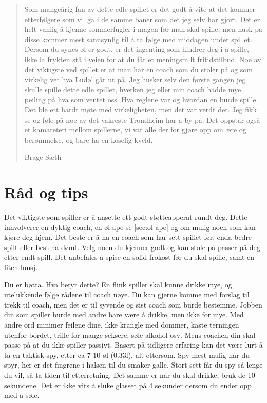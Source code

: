 \documentclass[10pt,a4paper,norsk,openany]{book}
\begin{document}
\blockquote[Brage Sæth]{%
  Som mangeårig fan av dette edle spillet er det godt å vite at det kommer
  etterfølgere som vil gå i de samme baner som det jeg selv har gjort. Det er
  helt vanlig å kjenne sommerfugler i magen før man skal spille, men husk på
  disse kommer mest sannsynlig til å ta følge med middagen under spillet. Dersom
  du synes øl er godt, er det ingenting som hindrer deg i å spille, ikke la
  frykten stå i veien for at du får et meningsfullt fritidstilbud. Noe av det
  viktigste ved spillet er at man har en coach som du stoler på og som virkelig
  vet hva Ludøl går ut på. Jeg husker selv den første gangen jeg skulle spille
  dette edle spillet, hverken jeg eller min coach hadde mye peiling på hva som
  ventet oss. Hva reglene var og hvordan en burde spille. Det ble ett hardt møte
  med virkeligheten, men det var verdt det. Jeg fikk se og føle på noe av det
  vakreste Trondheim har å by på. Det oppstår også et kamareteri mellom
  spillerne, vi var alle der for gjøre opp om ære og berømmelse, og bare ha en
  koselig kveld.}


\section{Råd og tips}

Det viktigste som spiller er å ansette ett godt støtteapperat rundt deg. Dette
innvolverer en dyktig coach, en øl-ape se \cref{sec:ol-ape} og om mulig noen som
kan kjøre deg hjem. Det beste er å ha en coach som har sett spillet før, enda
bedre spilt eller best ha dømt. Velg noen du kjenner godt og kan stole på passer
på deg etter endt spill. Det anbefales å spise en solid frokost før du skal
spille, samt en liten lunsj.

Du er bøtta. Hva betyr dette? En flink spiller skal kunne drikke mye, og
utelukkende følge rådene til coach nøye. Du kan gjerne komme med forslag til
trekk til coach, men det er til syvende og sist coach som burde bestemme. Jobben
din som spiller burde med andre bare være å drikke, men ikke for mye. Med andre
ord minimer feilene dine, ikke krangle med dommer, kaste terningen utenfor
bordet, trille for mange seksere, søle alkohol osv. Mens coachen din skal passe
på at du ikke spiller passivt. Basert på tidligere erfaring kan det være lurt å
ta en taktisk spy, etter ca 7-10 øl (0.33l), alt ettersom. Spy mest mulig når du
spyr, her er det fingrene i halsen til du smaker galle. Stort sett får du spy så
lenge du vil, så ta tiden til etterretning. Det samme er når du skal drikke,
bruk de 10 sekundene. Det er ikke vits å sluke glasset på 4 sekunder dersom du
ender opp med å søle. \medskip
\end{document}
